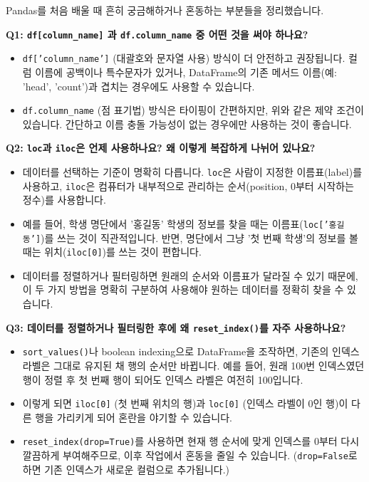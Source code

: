 \documentclass[11pt,a4paper]{book}
\theoremstyle{definition}
\begin{document}
Pandas를 처음 배울 때 흔히 궁금해하거나 혼동하는 부분들을 정리했습니다.

\textbf{Q1: \texttt{df[column\_name]} 과 \texttt{df.column\_name} 중 어떤 것을 써야 하나요?}
\begin{itemize}
    \item \texttt{df['column\_name']} (대괄호와 문자열 사용) 방식이 더 안전하고 권장됩니다. 컬럼 이름에 공백이나 특수문자가 있거나, DataFrame의 기존 메서드 이름(예: 'head', 'count')과 겹치는 경우에도 사용할 수 있습니다.
    \item \texttt{df.column\_name} (점 표기법) 방식은 타이핑이 간편하지만, 위와 같은 제약 조건이 있습니다. 간단하고 이름 충돌 가능성이 없는 경우에만 사용하는 것이 좋습니다.
\end{itemize}

\textbf{Q2: \texttt{loc}과 \texttt{iloc}은 언제 사용하나요? 왜 이렇게 복잡하게 나뉘어 있나요?}
\begin{itemize}
    \item 데이터를 선택하는 기준이 명확히 다릅니다. \texttt{loc}은 사람이 지정한 이름표(label)를 사용하고, \texttt{iloc}은 컴퓨터가 내부적으로 관리하는 순서(position, 0부터 시작하는 정수)를 사용합니다.
    \item 예를 들어, 학생 명단에서 '홍길동' 학생의 정보를 찾을 때는 이름표(\texttt{loc['홍길동']})를 쓰는 것이 직관적입니다. 반면, 명단에서 그냥 '첫 번째 학생'의 정보를 볼 때는 위치(\texttt{iloc[0]})를 쓰는 것이 편합니다.
    \item 데이터를 정렬하거나 필터링하면 원래의 순서와 이름표가 달라질 수 있기 때문에, 이 두 가지 방법을 명확히 구분하여 사용해야 원하는 데이터를 정확히 찾을 수 있습니다.
\end{itemize}

\textbf{Q3: 데이터를 정렬하거나 필터링한 후에 왜 \texttt{reset\_index()}를 자주 사용하나요?}
\begin{itemize}
    \item \texttt{sort\_values()}나 boolean indexing으로 DataFrame을 조작하면, 기존의 인덱스 라벨은 그대로 유지된 채 행의 순서만 바뀝니다. 예를 들어, 원래 100번 인덱스였던 행이 정렬 후 첫 번째 행이 되어도 인덱스 라벨은 여전히 100입니다.
    \item 이렇게 되면 \texttt{iloc[0]} (첫 번째 위치의 행)과 \texttt{loc[0]} (인덱스 라벨이 0인 행)이 다른 행을 가리키게 되어 혼란을 야기할 수 있습니다.
    \item \texttt{reset\_index(drop=True)}를 사용하면 현재 행 순서에 맞게 인덱스를 0부터 다시 깔끔하게 부여해주므로, 이후 작업에서 혼동을 줄일 수 있습니다. (\texttt{drop=False}로 하면 기존 인덱스가 새로운 컬럼으로 추가됩니다.)
\end{itemize}
\end{document}

